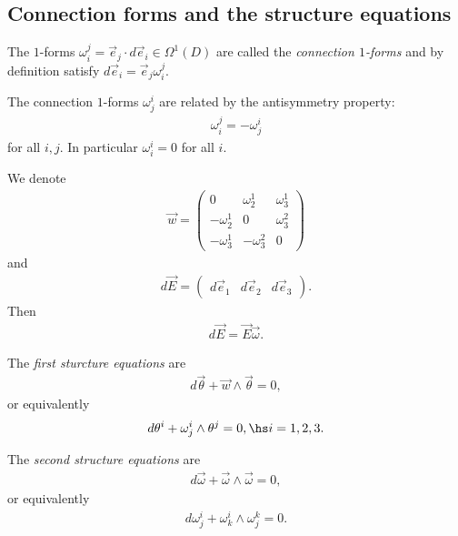 \documentclass{article}
\begin{document}
\subsection{Connection forms and the structure equations}

\begin{definition}
    The $1$-forms $\omega_i^j=\vec e_j\cdot d\vec e_i\in\Omega^1(D)$ are called the 
    \emph{connection $1$-forms} and by definition satisfy $d\vec e_i = \vec e_j\omega_i^j$.
\end{definition}

\begin{proposition}
    The connection $1$-forms $\omega_j^i$ are related by the antisymmetry property: 
    \begin{align*}
        \omega_i^j = -\omega_j^i
    \end{align*}
    for all $i,j$. In particular $\omega_i^i = 0$ for all $i$.
\end{proposition}

\begin{lemma}
    We denote 
    \begin{align*}
        \vec w = \begin{pmatrix}
            0           & \omega_2^1  & \omega_3^1 \\
            -\omega_2^1 & 0           & \omega_3^2 \\
            -\omega_3^1 & -\omega_3^2 & 0
        \end{pmatrix}
    \end{align*}
    and 
    \begin{align*}
        d\vec E = \begin{pmatrix}
            d\vec e_1 & d\vec e_2 & d\vec e_3
        \end{pmatrix}.
    \end{align*}
    Then 
    \begin{align*}
        d\vec E = \vec E\vec\omega.
    \end{align*}
\end{lemma}

\begin{theorem}
    The \emph{first sturcture equations} are 
    \begin{align*}
        d\vec\theta + \vec w \wedge \vec \theta = 0,
    \end{align*}
    or equivalently 
    \begin{align*}
        d\theta^i + \omega_j^i \wedge \theta^j = 0,\hs i=1,2,3.
    \end{align*}
\end{theorem}

\begin{theorem}
    The \emph{second structure equations} are 
    \begin{align*}
        d\vec\omega + \vec \omega \wedge\vec \omega = 0,
    \end{align*}
    or equivalently 
    \begin{align*}
        d\omega_j^i + \omega_k^i\wedge\omega_j^k=0.
    \end{align*}
\end{theorem}
\end{document}
